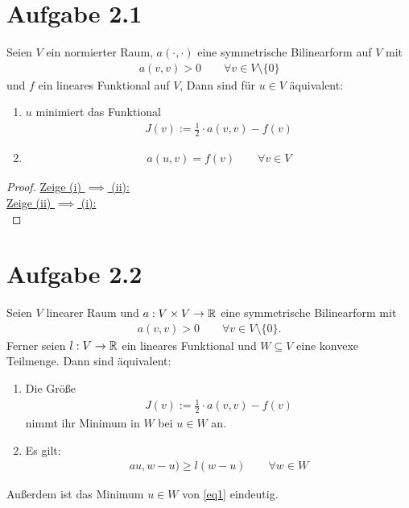 \documentclass[12pt,a4paper]{article}
\author{Willi Sontopski}
\begin{document}

\section*{Aufgabe 2.1}
Seien $V$ ein normierter Raum, $a(\cdot,\cdot)$ eine symmetrische Bilinearform auf $V$ mit
\begin{align*}
a(v,v)>0\qquad\forall v\in V\setminus\lbrace0\rbrace
\end{align*}
und $f$ ein lineares Funktional auf $V$, Dann sind für $u\in V$ äquivalent:
\begin{enumerate}[label=(\roman*)]
\item $u$ minimiert das Funktional 
\begin{align}\label{Variationsproblem}\tag{Variationsproblem}
J(v):=\frac{1}{2}\cdot a(v,v)-f(v)
\end{align}
\item \begin{align}\label{Variationsgleichung}\tag{Variationsgleichung}
a(u,v)=f(v)\qquad\forall v\in V
\end{align}
\end{enumerate}

\begin{proof}
\underline{Zeige (i) $\implies$ (ii):}\\

\underline{Zeige (ii) $\implies$ (i):}\\

\end{proof}

\section*{Aufgabe 2.2}
Seien $V$ linearer Raum und $a:V\times V\to\mathbb{R}$ eine symmetrische Bilinearform mit
\begin{align*}
a(v,v)>0\qquad\forall v\in V\setminus\lbrace0\rbrace.
\end{align*}
Ferner seien $l:V\to\mathbb{R}$ ein lineares Funktional und $W\subseteq V$ eine konvexe Teilmenge. Dann sind äquivalent:
\begin{enumerate}[label=(\roman*)]
\item Die Größe
\begin{align}\label{eq1}
J(v):=\frac{1}{2}\cdot a(v,v)-f(v)
\end{align}
nimmt ihr Minimum in $W$ bei $u\in W$ an.
\item Es gilt:
\begin{align}\label{eq2}
au,w-u)\geq l(w-u)\qquad\forall w\in W
\end{align}
\end{enumerate}
Außerdem ist das Minimum $u\in W$ von \eqref{eq1} eindeutig.
\end{document}
